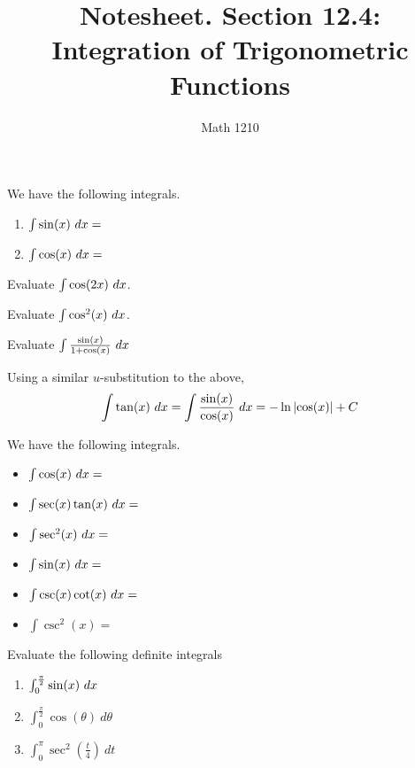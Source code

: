 \documentclass[12pt, a4paper]{article}
\author{Math 1210}
\title{Notesheet. Section 12.4: Integration of Trigonometric Functions}
\date{}
\begin{document}
\maketitle
\nameline
\begin{thrm}
  We have the following integrals.
  \begin{enumerate}
  \item \(\int \sin(x) \ d x = \)
  \item \(\int \cos(x) \ d x = \)
  \end{enumerate}
\end{thrm}
\begin{ex}
  Evaluate \(\int \cos(2x) \ d x\).
\end{ex}
\begin{ex}
  Evaluate \(\int \cos^2(x) \ d x\).
\end{ex}
\begin{ex}
  Evaluate \(\int \frac{\sin(x)}{1+\cos(x)} \ d x\)
\end{ex}
\begin{thrm}
  Using a similar \(u\)-substitution to the above, \[
    \int \tan(x) \ d x = \int \frac{\sin(x)}{\cos(x)} \ d x = - \ln\left| \cos(x) \right| + C
  \]
\end{thrm}
\vspace{-0.75in}
\begin{thrm}
  We have the following integrals.\\
  \begin{minipage}{0.5\linewidth}
    \begin{itemize}
    \item \(\int \cos(x) \ d x = \)
    \item \(\int \sec(x) \tan(x) \ d x = \)
    \item \(\int \sec^2(x) \ d x = \)
    \end{itemize}
  \end{minipage}
  \begin{minipage}{0.4\linewidth}
    \begin{itemize}
    \item \(\int \sin(x) \ d x = \)
    \item \(\int \csc(x) \cot(x) \ d x = \)
    \item \(\int \csc^2(x) = \)
    \end{itemize}
  \end{minipage}
\end{thrm}
\vspace{-0.75in}
\begin{ex}
  Evaluate the following definite integrals
  \begin{enumerate}
  \item \(\int_0^{\frac{\pi}{2}} \sin(x) \ d x\)
    \vspace{0.75in}
  \item \(\int_0^{\frac{\pi}{2}} \cos(\theta) \ d\theta\)
    \vspace{0.75in}
  \item \(\int_0^\pi \sec^2\left(\frac{t}{4}\right) \ dt\)
  \end{enumerate}
\end{ex}
\end{document}
